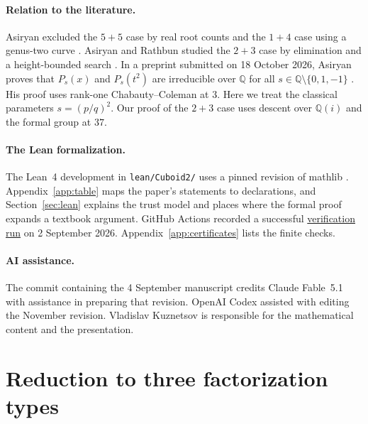 \documentclass[10pt]{article}
\theoremstyle{definition}
\theoremstyle{remark}
\newcommand{\Q}{\mathbb{Q}}
\begin{document}
\paragraph{Relation to the literature.}
Asiryan excluded the $5+5$ case by real root counts \cite{Asiryan2026a} and
the $1+4$ case using a genus-two curve \cite{Asiryan2026b}. Asiryan and
Rathbun studied the $2+3$ case by elimination and a height-bounded search
\cite{AsiryanRathbun2026}. In a preprint submitted on 18 October 2026,
Asiryan proves that $P_s(x)$ and $P_s(t^2)$ are irreducible over $\Q$ for
all $s\in\Q\setminus\{0,1,-1\}$ \cite[Corollary~3]{Asiryan2026c}. His
proof uses rank-one Chabauty--Coleman at $3$. Here we treat the classical
parameters $s=(p/q)^2$. Our proof of the $2+3$ case uses descent over
$\Q(i)$ and the formal group at $37$.

\paragraph{The Lean formalization.}
The Lean~4 development in \texttt{lean/\allowbreak Cuboid2/\allowbreak } uses
a pinned revision of mathlib \cite{mathlib}. Appendix~\ref{app:table} maps the
paper's statements to declarations, and Section~\ref{sec:lean} explains the
trust model and places where the formal proof expands a textbook argument.
GitHub Actions recorded a successful
\href{https://github.com/AnanasClassic/cuboid-2/actions/runs/33671888493}{verification
run} on 2 September 2026.
Appendix~\ref{app:certificates} lists the finite checks.

\paragraph{AI assistance.}
The commit containing the 4 September manuscript credits Claude Fable~5.1
with assistance in preparing that revision. OpenAI Codex assisted with
editing the November revision. Vladislav Kuznetsov is responsible for the
mathematical content and the presentation.

\section{Reduction to three factorization types}\label{sec:reduction}
\end{document}
